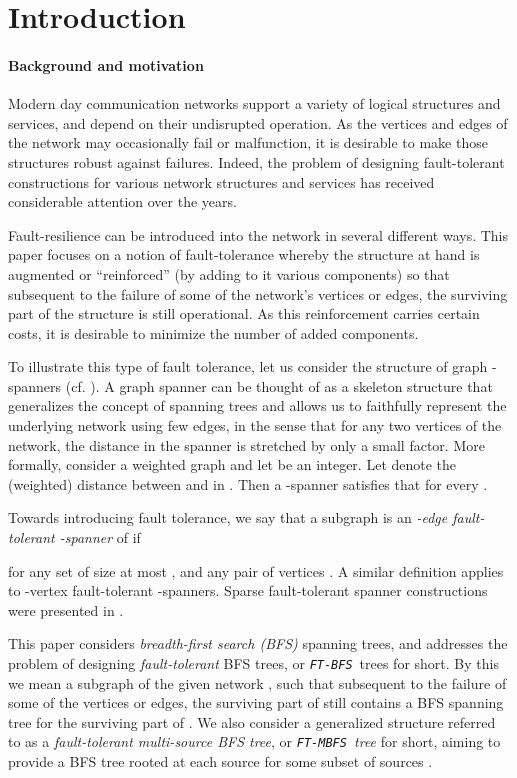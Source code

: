\documentclass[12pt]{article}
\def\FTMBFS{\mbox{\tt FT-MBFS}}
\def\FTBFS{\mbox{\tt FT-BFS}}
\begin{document}
\section{Introduction}
\paragraph{Background and motivation}
Modern day communication networks support a variety of logical structures
and services, and depend on their undisrupted operation.
As the vertices and edges of the network may occasionally fail or malfunction,
it is desirable to make those structures robust against failures.
Indeed, the problem of designing fault-tolerant constructions for various
network structures and services has received considerable attention
over the years.

Fault-resilience can be introduced into the network in several different ways.
This paper focuses on a notion of fault-tolerance whereby the structure at hand
is augmented or ``reinforced'' (by adding to it various components)
so that subsequent to the failure of some of the network's vertices or edges,
the surviving part of the structure is still operational.
As this reinforcement carries certain costs, it is desirable to minimize the number of added components.

To illustrate this type of fault tolerance,
let us consider the structure of graph -spanners
(cf. \cite{Peleg00:book,PelegS-89,PelegU-89}).
A graph spanner  can be thought of as a skeleton structure
that generalizes the concept of spanning trees and allows us
to faithfully represent the underlying network using few edges,
in the sense that for any two vertices of the network, the distance
in the spanner is stretched by only a small factor.
More formally, consider a weighted graph  and let  be an integer.
Let  denote the (weighted) distance between  and  in .
Then a -spanner  satisfies that
 for every .
\par Towards introducing fault tolerance, we say that a subgraph  is
an {\em -edge fault-tolerant -spanner} of  if

for any set  of size at most ,
and any pair of vertices . A similar definition applies to
-vertex fault-tolerant -spanners. Sparse fault-tolerant spanner
constructions were presented in \cite{CLPR09-span,DK11}.

This paper considers {\em breadth-first search (BFS)} spanning trees,
and addresses the problem of designing {\em fault-tolerant} BFS trees,
or {\em \FTBFS}\ trees for short.
By this we mean a subgraph  of the given network ,
such that subsequent to the failure of some
of the vertices or edges,
the surviving part  of  still contains a BFS spanning tree for
the surviving part of .
We also consider a generalized structure referred to as a
{\em fault-tolerant multi-source BFS tree}, or {\em \FTMBFS\ tree} for short,
aiming to provide a BFS tree rooted at each source  for some subset
of sources .
\end{document}
